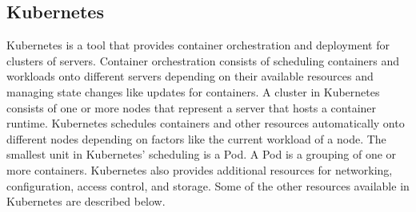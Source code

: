 \subsection*{Kubernetes}

Kubernetes \cite{KUB-DOCS} is a tool that provides container orchestration and deployment
for clusters of servers. Container orchestration consists of scheduling containers and workloads
onto different servers depending on their available resources and managing state changes like updates
for containers. 
A cluster in Kubernetes consists of one or more nodes that represent a server that hosts a container runtime.
Kubernetes schedules containers and other resources automatically onto different nodes
depending on factors like the current workload of a node.
The smallest unit in Kubernetes' scheduling is a Pod. A Pod is a grouping of one or more containers.
Kubernetes also provides additional resources for networking, configuration, access control, and storage.
Some of the other resources available in Kubernetes are described below.

